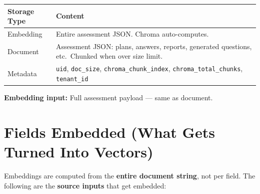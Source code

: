 \documentclass[11pt]{article}
\begin{document}
\begin{table}[h]
\centering
\begin{tabular}{@{}p{2.2cm}p{11cm}@{}}
\toprule
\textbf{Storage Type} & \textbf{Content} \\
\midrule
Embedding & Entire assessment JSON. Chroma auto-computes. \\
\midrule
Document & Assessment JSON: plans, answers, reports, generated questions, etc.\ Chunked when over size limit. \\
\midrule
Metadata & \texttt{uid}, \texttt{doc\_size}, \texttt{chroma\_chunk\_index}, \texttt{chroma\_total\_chunks}, \texttt{tenant\_id} \\
\bottomrule
\end{tabular}
\end{table}

\textbf{Embedding input:} Full assessment payload --- same as document.

\section{Fields Embedded (What Gets Turned Into Vectors)}

Embeddings are computed from the \textbf{entire document string}, not per field. The following are the \textbf{source inputs} that get embedded:
\end{document}
